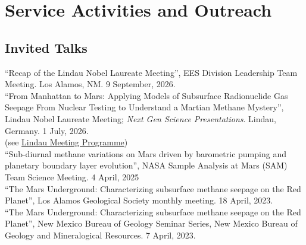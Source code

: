 \documentclass[11pt, letterpaper]{article}
\newcommand{\years}[1]{\marginnote{\scriptsize #1}}
\begin{document}
{{%

\section*{Service Activities and Outreach}

\subsection*{Invited Talks}
\label{sec:invitedTalks}
\years{2026} ``Recap of the  Lindau Nobel Laureate Meeting'', 
EES Division Leadership Team Meeting.
Los Alamos, NM.  9 September, 2026.\\
%
\years{2026} ``From Manhattan to Mars: Applying Models of Subsurface
Radionuclide Gas Seepage From Nuclear Testing to Understand a Martian Methane
Mystery'',  Lindau Nobel Laureate Meeting; \textit{Next Gen Science
Presentations}. Lindau, Germany.  1 July, 2026.\\
(see \href{https://www.mediatheque.lindau-nobel.org/meetings/2026/programme/42971}{Lindau Meeting Programme})\\
%
\years{2025} ``Sub-diurnal methane variations on Mars driven by barometric
pumping and planetary boundary layer evolution'', NASA Sample Analysis at Mars
(SAM) Team Science Meeting. 4 April, 2025\\ 
%
\years{2023} ``The Mars Underground: Characterizing subsurface methane seepage
on the Red Planet'', Los Alamos Geological Society monthly meeting. 18 April,
2023.\\ 
%
\years{2023} ``The Mars Underground: Characterizing subsurface methane seepage
on the Red Planet'', New Mexico Bureau of Geology Seminar Series, New
Mexico Bureau of Geology and Mineralogical Resources. 7 April, 2023.\\
%

}}
\end{document}
